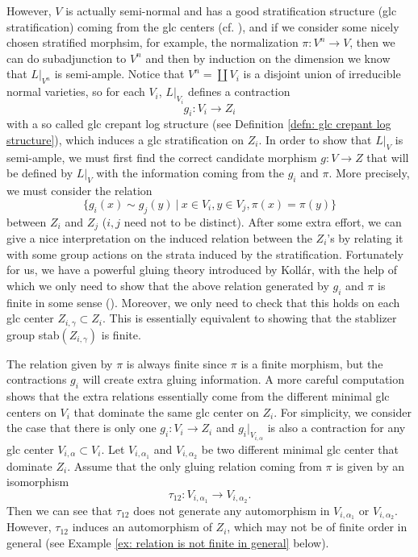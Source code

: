 \documentclass[11pt]{amsart}
\numberwithin{equation}{section}
\theoremstyle{definition}
\theoremstyle{definition}
\theoremstyle{definition}
\begin{document}
However, $V$ is actually semi-normal and has a good stratification structure (glc stratification) coming from the glc centers (cf. \cite{LX22b}), and if we consider some nicely chosen stratified morphsim, for example, the normalization $\pi:V^n\to V$, then we can do subadjunction to $V^n$ and then by induction on the dimension we know that $L|_{V^n}$ is semi-ample. Notice that $V^n=\coprod V_i$ is a disjoint union of irreducible normal varieties, so for each $V_i$, $L|_{V_i}$ defines a contraction 
$$
g_i:V_i\to Z_i
$$
with a so called glc crepant log structure (see Definition \ref{defn: glc crepant log structure}), which induces a glc stratification on $Z_i$. In order to show that $L|_V$ is semi-ample, we must first find the correct candidate morphism $g:V\to Z$ that will be defined by $L|_V$ with the information coming from the $g_i$ and $\pi$. More precisely, we must consider the relation
$$
\{g_i(x)\sim g_j(y)~|~x\in V_i, y\in V_j, \pi(x)=\pi(y)\}
$$
between $Z_i$ and $Z_j$ ($i,j$ need not to be distinct). After some extra effort, we can give a nice interpretation on the induced relation between the $Z_i$'s by relating it with some group actions on the strata induced by the stratification. Fortunately for us, we have a powerful gluing theory introduced by Koll\'ar, with the help of which we only need to show that the above relation generated by $g_i$ and $\pi$ is finite in some sense (\cite[Theorem 9.21]{Kol13}). Moreover, we only need to check that this holds on each glc center $Z_{i,\gamma}\subset Z_i$. This is essentially equivalent to showing that the stablizer group stab$(Z_{i,\gamma})$ is finite.

The relation given by $\pi$ is always finite since $\pi$ is a finite morphism, but the contractions $g_i$ will create extra gluing information. A more careful computation shows that the extra relations essentially come from the different minimal glc centers on $V_i$ that dominate the same glc center on $Z_i$. For simplicity, we consider the case that there is only one $g_i:V_i\to Z_i$ and $g_i|_{V_{i,\alpha}}$ is also a contraction for any glc center $V_{i,\alpha}\subset V_i$. Let $V_{i,\alpha_1}$ and $V_{i,\alpha_2}$ be two different minimal glc center that dominate $Z_i$. Assume that the only gluing relation coming from $\pi$ is given by an isomorphism
$$
\tau_{12}:V_{i,\alpha_1}\to V_{i,\alpha_2}.
$$  
Then we can see that $\tau_{12}$ does not generate any automorphism in $V_{i,\alpha_1}$ or $V_{i,\alpha_2}$. However, $\tau_{12}$ induces an automorphism of $Z_i$, which may not be of finite order in general (see Example \ref{ex: relation is not finite in general} below). 
\end{document}
